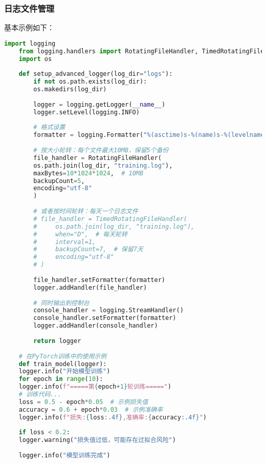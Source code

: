 \subsubsection{日志文件管理}
基本示例如下：
\begin{lstlisting}[language=python,caption={日志文件的轮转},label=code:Log_File_Management]
	import logging
	from logging.handlers import RotatingFileHandler, TimedRotatingFileHandler
	import os
	
	def setup_advanced_logger(log_dir="logs"):
		if not os.path.exists(log_dir):
		os.makedirs(log_dir)
	
		logger = logging.getLogger(__name__)
		logger.setLevel(logging.INFO)
	
		# 格式设置
		formatter = logging.Formatter("%(asctime)s-%(name)s-%(levelname)s-%(message)s")
	
		# 按大小轮转：每个文件最大10MB，保留5个备份
		file_handler = RotatingFileHandler(
		os.path.join(log_dir, "training.log"),
		maxBytes=10*1024*1024,  # 10MB
		backupCount=5,
		encoding="utf-8"
		)
	
		# 或者按时间轮转：每天一个日志文件
		# file_handler = TimedRotatingFileHandler(
		#     os.path.join(log_dir, "training.log"),
		#     when="D",  # 每天轮转
		#     interval=1,
		#     backupCount=7,  # 保留7天
		#     encoding="utf-8"
		# )
	
		file_handler.setFormatter(formatter)
		logger.addHandler(file_handler)
	
		# 同时输出到控制台
		console_handler = logging.StreamHandler()
		console_handler.setFormatter(formatter)
		logger.addHandler(console_handler)
	
		return logger
	
	# 在PyTorch训练中的使用示例
	def train_model(logger):
	logger.info("开始模型训练")
	for epoch in range(10):
	logger.info(f"=====第{epoch+1}轮训练=====")
	# 训练代码...
	loss = 0.5 - epoch*0.05  # 示例损失值
	accuracy = 0.6 + epoch*0.03  # 示例准确率
	logger.info(f"损失:{loss:.4f},准确率:{accuracy:.4f}")
	
	if loss < 0.2:
	logger.warning("损失值过低，可能存在过拟合风险")
	
	logger.info("模型训练完成")
\end{lstlisting}


